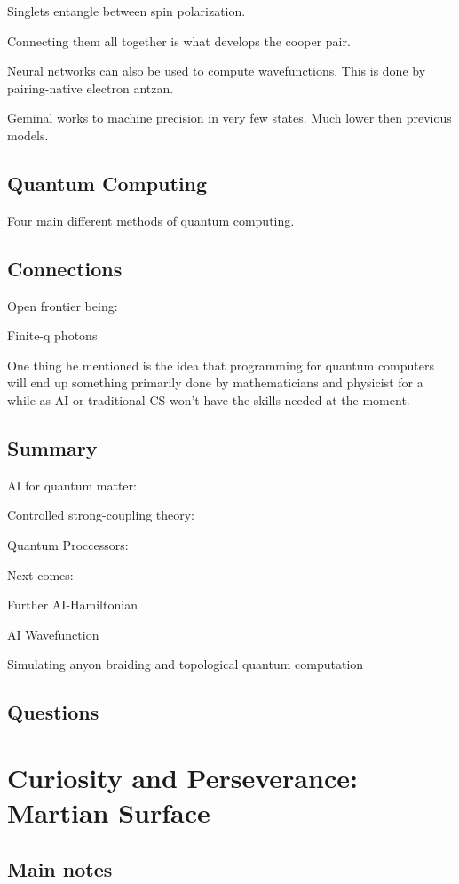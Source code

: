 Singlets entangle between spin polarization.

Connecting them all together is what develops the cooper pair.

Neural networks can also be used to compute wavefunctions. This is done by pairing-native electron antzan.

Geminal works to machine precision in very few states. Much lower then previous models.



\subsection{Quantum Computing}

Four main different methods of quantum computing.
\subsection{Connections}

Open frontier being:

Finite-q photons

One thing he mentioned is the idea that programming for quantum computers will end up something primarily done by mathematicians and physicist for a while as AI or traditional CS won't have the skills needed at the moment.

\subsection{Summary}
AI for quantum matter:

Controlled strong-coupling theory:

Quantum Proccessors:


Next comes:

Further AI-Hamiltonian

AI Wavefunction

Simulating anyon braiding and topological quantum computation

\subsection{Questions}




\section{Curiosity and Perseverance: Martian Surface}
\subsection{Main notes}

